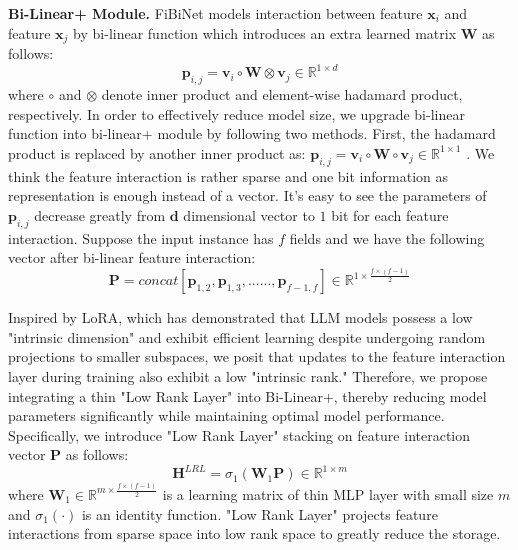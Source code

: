 \documentclass[sigconf]{acmart}
\begin{document}
\textbf{Bi-Linear+ Module.}
FiBiNet models interaction between feature $\mathbf{x}_i$ and feature $\mathbf{x}_j$ by bi-linear function which introduces an extra learned matrix $\mathbf{W}$ as follows:
\begin{equation}
\mathbf{p}_{i,j} = \mathbf{v}_{i}\circ\mathbf{W}\otimes\mathbf{v}_{j} \in \mathbb{R}^{1\times d}
\end{equation}
where $\circ$ and $\otimes$ denote inner product and element-wise hadamard product, respectively. In order to effectively reduce model size, we upgrade bi-linear function into bi-linear+ module by following two methods. First, the hadamard product is replaced by another inner product as: $\mathbf{p}_{i,j} = \mathbf{v}_{i}\circ\mathbf{W}\circ\mathbf{v}_{j} \in \mathbb{R}^{1\times 1}$
. We think the feature interaction is rather sparse and one bit information as representation is enough instead of a vector. It's easy to see the parameters of $\mathbf{p}_{i,j}$ decrease greatly from  $\mathbf{d}$ dimensional vector to $1$ bit for each feature interaction. Suppose the input instance has $f$ fields and we have the following  vector after bi-linear feature interaction:
\begin{equation}
         \mathbf{P} = concat[\mathbf{p}_{1,2},\mathbf{p}_{1,3},......,\mathbf{p}_{f-1,f}] \in \mathbb{R}^{1\times \frac{f\times (f-1)}{2} }    
 \end{equation}


Inspired by LoRA\cite{lora}, which has demonstrated that LLM models possess a low "intrinsic dimension" and exhibit efficient learning despite undergoing random projections to smaller subspaces, we posit that updates to the feature interaction layer during training also exhibit a low "intrinsic rank." Therefore, we propose integrating a thin "Low Rank Layer" into Bi-Linear+, thereby reducing model parameters significantly while maintaining optimal model performance. Specifically, we introduce "Low Rank Layer" stacking on feature interaction vector  $\mathbf{P}$ as follows:
 \begin{equation}
\mathbf{H}^{LRL} = \sigma_1\left(\mathbf{W}_{1}\mathbf{P}\right )\in \mathbb{R}^{1\times m}
\end{equation}
where $\mathbf{W}_1 \in \mathbb{R}^{ m\times \frac{f\times (f-1)}{2} } $ is a learning matrix of thin MLP layer with small size  $m$ and $\sigma_1\left(\cdot\right) $ is an identity function. "Low Rank Layer" projects feature interactions from  sparse space into low rank space to greatly reduce the storage.
\end{document}
